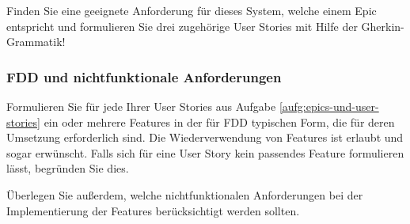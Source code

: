 \documentclass[acmtog]{acmart}
\begin{document}
Finden Sie eine geeignete Anforderung für dieses System, welche einem Epic entspricht und formulieren Sie drei zugehörige
User Stories mit Hilfe der Gherkin-Grammatik!

\subsubsection{FDD und nichtfunktionale Anforderungen}
Formulieren Sie für jede Ihrer User Stories aus Aufgabe \ref{aufg:epics-und-user-stories} ein oder mehrere Features in der für FDD typischen Form, die für deren Umsetzung erforderlich sind. Die Wiederverwendung von Features ist erlaubt und sogar erwünscht. Falls sich für eine User Story kein passendes Feature formulieren lässt, begründen Sie dies.

Überlegen Sie außerdem, welche nichtfunktionalen Anforderungen bei der Implementierung der Features berücksichtigt werden sollten.
\end{document}
